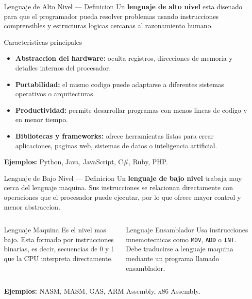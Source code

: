 \documentclass[10pt, aspectratio=169]{beamer}
\begin{document}
	\begin{frame}{Lenguaje de Alto Nivel --- Definicion}
		Un \textbf{lenguaje de alto nivel} esta disenado para que el programador pueda
		resolver problemas usando instrucciones comprensibles y estructuras logicas
		cercanas al razonamiento humano.
		
		\vspace{0.25cm}
		\begin{block}{Caracteristicas principales}
			\begin{itemize}
				\item \textbf{Abstraccion del hardware:} oculta registros, direcciones de memoria
				y detalles internos del procesador.
				\item \textbf{Portabilidad:} el mismo codigo puede adaptarse a diferentes
				sistemas operativos o arquitecturas.
				\item \textbf{Productividad:} permite desarrollar programas con menos lineas de
				codigo y en menor tiempo.
				\item \textbf{Bibliotecas y frameworks:} ofrece herramientas listas para crear
				aplicaciones, paginas web, sistemas de datos o inteligencia artificial.
			\end{itemize}
		\end{block}
		
		\vspace{0.2cm}
		\small \textbf{Ejemplos:} Python, Java, JavaScript, C\#, Ruby, PHP.
	\end{frame}
	
	\begin{frame}{Lenguaje de Bajo Nivel --- Definicion}
		Un \textbf{lenguaje de bajo nivel} trabaja muy cerca del lenguaje maquina. Sus
		instrucciones se relacionan directamente con operaciones que el procesador puede
		ejecutar, por lo que ofrece mayor control y menor abstraccion.
		
		\vspace{0.25cm}
		\begin{columns}
			\begin{block}{Lenguaje Maquina}
				Es el nivel mas bajo. Esta formado por instrucciones binarias, es decir,
				secuencias de 0 y 1 que la CPU interpreta directamente.
			\end{block}
			
			\begin{block}{Lenguaje Ensamblador}
				Usa instrucciones mnemotecnicas como \texttt{MOV}, \texttt{ADD} o \texttt{INT}.
				Debe traducirse a lenguaje maquina mediante un programa llamado ensamblador.
			\end{block}
		\end{columns}
		
		\vspace{0.25cm}
		\small \textbf{Ejemplos:} NASM, MASM, GAS, ARM Assembly, x86 Assembly.
	\end{frame}
	
\end{document}
